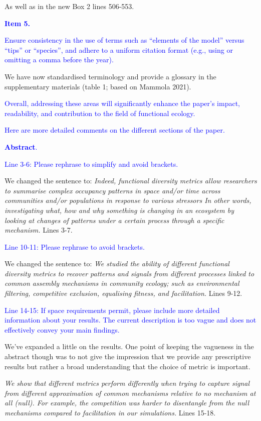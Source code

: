 \documentclass[
]{article}
\begin{document}
As well as in the new Box 2 lines 506-553.

\textcolor{blue}{\textbf{Item 5.}}

\textcolor{blue}{Ensure consistency in the use of terms such as ``elements of the model'' versus ``tips'' or ``species'', and adhere to a uniform citation format (e.g., using or omitting a comma before the year).}

We have now standardised terminology and provide a glossary in the supplementary materials (table 1; based on Mammola 2021).

\textcolor{blue}{Overall, addressing these areas will significantly enhance the paper's impact, readability, and contribution to the field of functional ecology.}

\textcolor{blue}{Here are more detailed comments on the different sections of the paper.}

\textcolor{blue}{\textbf{Abstract}.}

\textcolor{blue}{Line 3-6: Please rephrase to simplify and avoid brackets.}

We changed the sentence to:
\textit{Indeed, functional diversity metrics allow researchers to summarise complex occupancy patterns in space and/or time across communities and/or populations in response to various stressors
In other words, investigating what, how and why something is changing in an ecosystem by looking at changes of patterns under a certain process through a specific mechanism.}
Lines 3-7.

\textcolor{blue}{Line 10-11: Please rephrase to avoid brackets.}

We changed the sentence to:
\textit{We studied the ability of different functional diversity metrics to recover patterns and signals from different processes linked to common assembly mechanisms in community ecology; such as environmental filtering, competitive exclusion, equalising fitness, and facilitation.}
Lines 9-12.

\textcolor{blue}{Line 14-15: If space requirements permit, please include more detailed information about your results.
The current description is too vague and does not effectively convey your main findings.}

We've expanded a little on the results.
One point of keeping the vagueness in the abstract though was to not give the impression that we provide any prescriptive results but rather a broad understanding that the choice of metric is important.

\textit{We show that different metrics perform differently when trying to capture signal from different approximation of common mechanisms relative to no mechanism at all (null).
For example, the competition was harder to disentangle from the null mechanisms compared to facilitation in our simulations.}
Lines 15-18.
\end{document}
